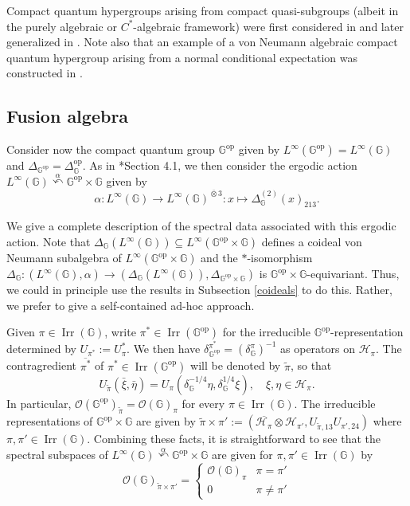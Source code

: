 \documentclass[reqno]{amsart}
\numberwithin{equation}{section}
\DeclareMathOperator{\Irr}{\mathrm{Irr}}
\newcommand{\op}{\mathrm{op}}
\newcommand{\mcH}{\mathcal{H}}
\newcommand{\mcO}{\mathcal{O}}
\newcommand{\G}{\mathbb{G}}
\newcommand{\ovot}{\bar{\otimes}}
\begin{document}
Compact quantum hypergroups arising from compact quasi-subgroups (albeit in the purely algebraic or $C^*$-algebraic framework) were first considered in \cite{Ka01} and later generalized in \cite{Zh20}. Note also that an example of a von Neumann algebraic compact quantum hypergroup arising from a normal conditional expectation was constructed in \cite{DC09b}. 

\subsection{Fusion algebra}\label{fusion algebra} Consider now the compact quantum group $\G^{\op}$ given by $L^\infty(\G^{\op})= L^\infty(\G)$ and $\Delta_{\G^{\op}}= \Delta_\G^{\op}$. As in \cite{DCDR25}*{Section 4.1}, we then consider the ergodic action $L^\infty(\G)\stackrel{\alpha}\curvearrowleft \G^{\op}\times \G$ given by
$$\alpha: L^\infty(\G)\to L^\infty(\G)^{\ovot 3}: x\mapsto \Delta_\G^{(2)}(x)_{213}.$$ 

We give a complete description of the spectral data associated with this ergodic action. Note that $\Delta_\G(L^\infty(\G))\subseteq L^\infty(\G^{\op}\times \G)$ defines a coideal von Neumann subalgebra of $L^\infty(\G^{\op}\times \G)$ and the $*$-isomorphism $\Delta_\G: (L^\infty(\G), \alpha)\to (\Delta_\G(L^\infty(\G)), \Delta_{\G^{\op}\times \G})$ is $\G^{\op}\times \G$-equivariant. Thus, we could in principle use the results in Subsection \ref{coideals} to do this. Rather, we prefer to give a self-contained ad-hoc approach. 

Given $\pi\in \Irr(\G)$, write $\pi^{*}\in \Irr(\G^{\op})$ for the irreducible $\G^{\op}$-representation determined  by $U_{\pi^*}:= U_\pi^*$. We then have $\delta_{\G^{\op}}^{\pi^*}= (\delta_\G^\pi)^{-1}$ as operators on $\mcH_\pi$.
The contragredient $\overline{\pi^*}$ of $\pi^*\in\Irr(\G^{\op})$ will be denoted by $\tilde{\pi}$, so that
$$U_{\tilde{\pi}}(\bar{\xi}, \bar{\eta})= U_\pi(\delta_\G^{-1/4}\eta, \delta_\G^{1/4}\xi), \quad \xi,\eta \in \mcH_\pi.$$
In particular, $\mcO(\G^{\op})_{\tilde{\pi}}= \mcO(\G)_\pi$ for every $\pi \in \Irr(\G)$.
The irreducible representations of $\G^{\op}\times \G$ are given by $
\tilde{\pi}\times \pi' := (\overline{\mcH_\pi}\otimes \mcH_{\pi'}, U_{\tilde{\pi},13}U_{\pi',24})$ where $\pi, \pi'\in \Irr(\G)$. Combining these facts, it is straightforward to see that the spectral subspaces of $L^\infty(\G)\stackrel{\alpha}\curvearrowleft \G^{\op}\times \G$ are given for $\pi, \pi'\in \Irr(\G)$ by
\begin{equation}\label{spectralsubspaces}
    \mcO(\G)_{\tilde{\pi}\times \pi'}= \begin{cases}
        \mcO(\G)_\pi & \pi = \pi'\\
        0 & \pi\ne \pi'
    \end{cases}
\end{equation}
\end{document}
